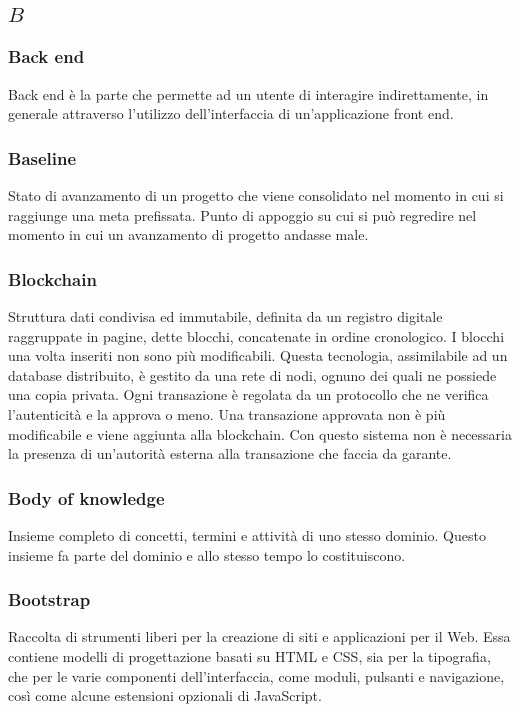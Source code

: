 \subsection*{\quad$B\quad$}
\subsubsection*{Back end}
Back end è la parte che permette ad un utente di interagire indirettamente, in generale attraverso l’utilizzo dell’interfaccia di un’applicazione front end.

\subsubsection*{Baseline}
Stato di avanzamento di un progetto che viene consolidato nel momento in cui si raggiunge una meta prefissata. Punto di appoggio su cui si può regredire nel momento in cui un avanzamento di progetto andasse male.

\subsubsection*{Blockchain}
Struttura dati condivisa ed immutabile, definita da un registro digitale raggruppate in pagine, dette blocchi, concatenate in ordine cronologico. I blocchi una volta inseriti non sono più modificabili. Questa tecnologia, assimilabile ad un database distribuito, è gestito da una rete di nodi, ognuno dei quali ne possiede una copia privata. Ogni transazione è regolata da un protocollo che
ne verifica l’autenticità e la approva o meno. Una transazione approvata non è più modificabile e viene aggiunta alla blockchain. Con questo sistema non è necessaria la presenza di un’autorità esterna alla transazione che faccia da garante.

\subsubsection*{Body of knowledge}
Insieme completo di concetti, termini e attività di uno stesso dominio. Questo insieme fa parte del dominio e allo stesso tempo lo costituiscono.

\subsubsection*{Bootstrap}
Raccolta di strumenti liberi per la creazione di siti e applicazioni per il Web. Essa contiene modelli di progettazione basati su HTML e CSS, sia per la tipografia, che per le varie componenti dell'interfaccia, come moduli, pulsanti e navigazione, così come alcune estensioni opzionali di JavaScript.
